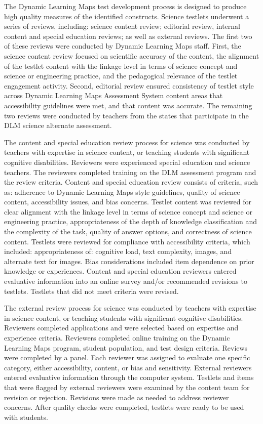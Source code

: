 \documentclass[11.5pt]{sig-alternate} %
\begin{document}
\begin{large}
The Dynamic Learning Maps test development process is designed to produce high quality measures of the identified constructs. Science testlets underwent a series of reviews, including: science content review; editorial review, internal content and special education reviews; as well as external reviews. The first two of these reviews were conducted by Dynamic Learning Maps staff. First, the science content review focused on scientific accuracy of the content, the alignment of the testlet content with the linkage level in terms of science concept and science or engineering practice, and the pedagogical relevance of the testlet engagement activity. Second, editorial review ensured consistency of testlet style across Dynamic Learning Maps Assessment System content areas that accessibility guidelines were met, and that content was accurate. The remaining two reviews were conducted by teachers from the states that participate in the DLM science alternate assessment.

The content and special education review process for science was conducted by teachers with expertise in science content, or teaching students with significant cognitive disabilities. Reviewers were experienced special education and science teachers. The reviewers completed training on the DLM assessment program and the review criteria. Content and special education review consists of criteria, such as: adherence to Dynamic Learning Maps style guidelines, quality of science content, accessibility issues, and bias concerns. Testlet content was reviewed for clear alignment with the linkage level in terms of science concept and science or engineering practice, appropriateness of the depth of knowledge classification and the complexity of the task, quality of answer options, and correctness of science content. Testlets were reviewed for compliance with accessibility criteria, which included: appropriateness of: cognitive load, text complexity, images, and alternate text for images. Bias considerations included item dependence on prior knowledge or experiences. Content and special education reviewers entered evaluative information into an online survey and/or recommended revisions to testlets. Testlets that did not meet criteria were revised.

The external review process for science was conducted by teachers with expertise in science content, or teaching students with significant cognitive disabilities. Reviewers completed applications and were selected based on expertise and experience criteria. Reviewers completed online training on the Dynamic Learning Maps program, student population, and test design criteria. Reviews were completed by a panel. Each reviewer was assigned to evaluate one specific category, either accessibility, content, or bias and sensitivity. External reviewers entered evaluative information through the computer system. Testlets and items that were flagged by external reviewers were examined by the content team for revision or rejection. Revisions were made as needed to address reviewer concerns. After quality checks were completed, testlets were ready to be used with students. 


\end{large}
\end{document}
